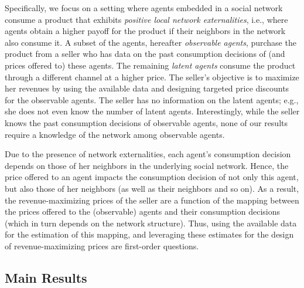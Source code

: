 \documentclass[opre,nonblindrev]{informs3} %
\begin{document}
Specifically, we focus on a setting where agents  embedded in a social network
 consume a product that exhibits \emph{positive local network externalities}, i.e., where agents obtain a higher payoff for the product if their neighbors in the network also consume it.
A subset of the agents, hereafter \emph{observable agents},
purchase the product from a seller who has data on the past consumption decisions of (and prices offered to) these agents.
 The remaining \emph{latent agents} consume the product through a different channel at a higher price.
The seller's objective is to maximize
her revenues by using the available data and designing targeted price discounts for the observable agents.
The seller
has no information on the latent agents; e.g.,
she does not even know the  number of latent agents.
Interestingly, while the seller knows the past consumption decisions of observable agents, none of our results 
require a knowledge of
the network among observable agents.






Due to the presence of network externalities, each agent's consumption decision depends on those of her neighbors in the underlying social network.
Hence, the price offered to an agent impacts the consumption decision of not only  this agent, but also those of her neighbors (as well as their neighbors and so on).
As a result,  the revenue-maximizing prices of the seller 
are a function of 
the  mapping between 
the prices offered to the 
(observable) agents and their consumption decisions (which in turn depends on the network structure).
Thus,
using the available data for
the estimation of 
this mapping,
and
leveraging these estimates for the
design of revenue-maximizing prices
are first-order questions.



\subsection{Main Results}
\end{document}
